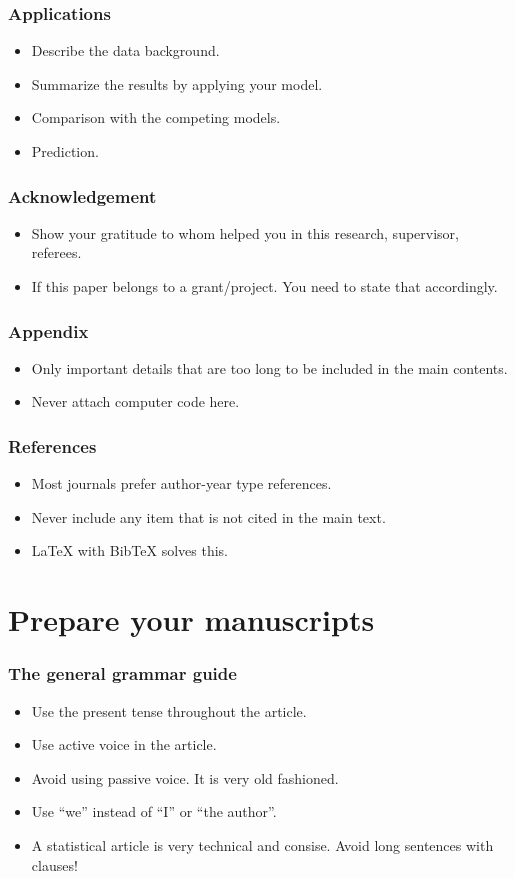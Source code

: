 \documentclass[10pt]{beamer}
\begin{document}
\begin{frame}
  \frametitle{Applications}
  \begin{itemize}
  \item Describe the data background.
  \item Summarize the results by applying your model.
  \item Comparison with the competing models.
  \item Prediction.
  \end{itemize}
\end{frame}

\begin{frame}
  \frametitle{Acknowledgement}
  \begin{itemize}
  \item Show your gratitude to whom helped you in this research, supervisor,
    referees.
  \item If this paper belongs to a grant/project. You need to state that
    accordingly.
  \end{itemize}
\end{frame}

\begin{frame}
  \frametitle{Appendix}
  \begin{itemize}
  \item Only important details that are too long to be included in the main contents.
  \item Never attach computer code here.
  \end{itemize}

\end{frame}

\begin{frame}
  \frametitle{References}
  \begin{itemize}
  \item Most journals prefer author-year type references.
  \item Never include any item that is not cited in the main text.
  \item LaTeX with BibTeX solves this.
  \end{itemize}
\end{frame}




\section{Prepare your manuscripts}
\begin{frame}
  \frametitle{The general grammar guide}

  \begin{itemize}
  \item Use the present tense throughout the article.
  \item Use active voice in the article.
  \item Avoid using passive voice. It is very old fashioned.
  \item Use ``we'' instead of ``I'' or ``the author''.
  \item A statistical article is very technical and consise. Avoid long
    sentences with clauses!
  \end{itemize}
\end{frame}
\end{document}

